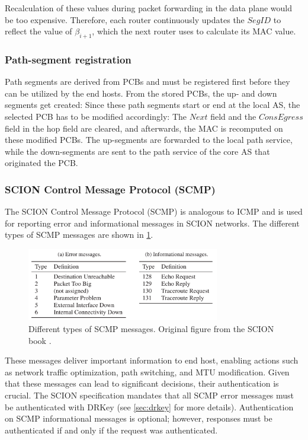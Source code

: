 Recalculation of these values during packet forwarding in the data plane would be too expensive.
Therefore, each router continuously updates the $SegID$ to reflect the value of $\beta_{i+1}$, which the next router uses to calculate its MAC value.

\subsubsection{Path-segment registration}
Path segments are derived from PCBs and must be registered first before they can be utilized by the end hosts.
From the stored PCBs, the up- and down segments get created:
Since these path segments start or end at the local AS, the selected PCB has to be modified accordingly:
The $Next$ field and the $ConsEgress$ field in the hop field are cleared, and afterwards, the MAC is recomputed on these modified PCBs.
The up-segments are forwarded to the local path service, while the down-segments are sent to the path service of the core AS that originated the PCB.

\subsubsection{SCION Control Message Protocol (SCMP)}


The SCION Control Message Protocol (SCMP) is analogous to ICMP and is used for reporting error and informational messages in SCION networks.
The different types of SCMP messages are shown in \cref{fig:scmp_message_types}.

\begin{figure}[h]
    \centering
    \includegraphics[width=0.75\textwidth]{figures/scmp_message_types.png}
\caption{Different types of SCMP messages. Original figure from the SCION book \cite[4.7.2]{Perrig2022}.}
    \label{fig:scmp_message_types}
\end{figure}

These messages deliver important information to end host, enabling actions such as network traffic optimization, path switching, and MTU modification.
Given that these messages can lead to significant decisions, their authentication is crucial.
The SCION specification mandates that all SCMP error messages must be authenticated with DRKey (see \cref{sec:drkey} for more details).
Authentication on SCMP informational messages is optional; however, responses must be authenticated if and only if the request was authenticated.

